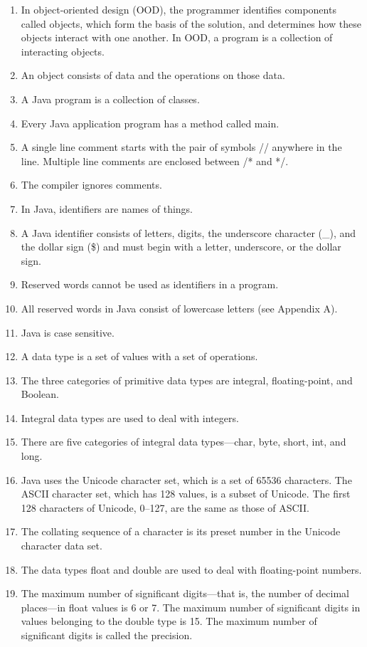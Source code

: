 \documentclass[12pt,a4paper,final,twoside,onecolumn,titlepage]{book}
\begin{document}
\begin{enumerate}
\item In object-oriented design (OOD), the programmer identifies components called objects, which form the basis of the solution, and determines how these objects interact with one another. In OOD, a program is a collection of interacting objects.
\item An object consists of data and the operations on those data.
\item A Java program is a collection of classes.
\item Every Java application program has a method called main.
\item A single line comment starts with the pair of symbols // anywhere in the line. Multiple line comments are enclosed between /* and */.
\item The compiler ignores comments.
\item In Java, identifiers are names of things.
\item A Java identifier consists of letters, digits, the underscore character (\_), and the dollar sign (\$) and must begin with a letter, underscore, or the dollar sign.
\item Reserved words cannot be used as identifiers in a program.
\item All reserved words in Java consist of lowercase letters (see Appendix A).
\item Java is case sensitive.
\item A data type is a set of values with a set of operations.
\item The three categories of primitive data types are integral, floating-point, and Boolean.
\item Integral data types are used to deal with integers.
\item There are five categories of integral data types—char, byte, short, int,
and long.
\item Java uses the Unicode character set, which is a set of 65536 characters. The ASCII character set, which has 128 values, is a subset of Unicode. The first 128 characters of Unicode, 0–127, are the same as those of ASCII.
\item The collating sequence of a character is its preset number in the Unicode character data set.
\item The data types float and double are used to deal with floating-point numbers.
\item The maximum number of significant digits—that is, the number of decimal places—in float values is 6 or 7. The maximum number of significant digits in values belonging to the double type is 15. The maximum number of significant digits is called the precision.

\end{enumerate}
\end{document}
